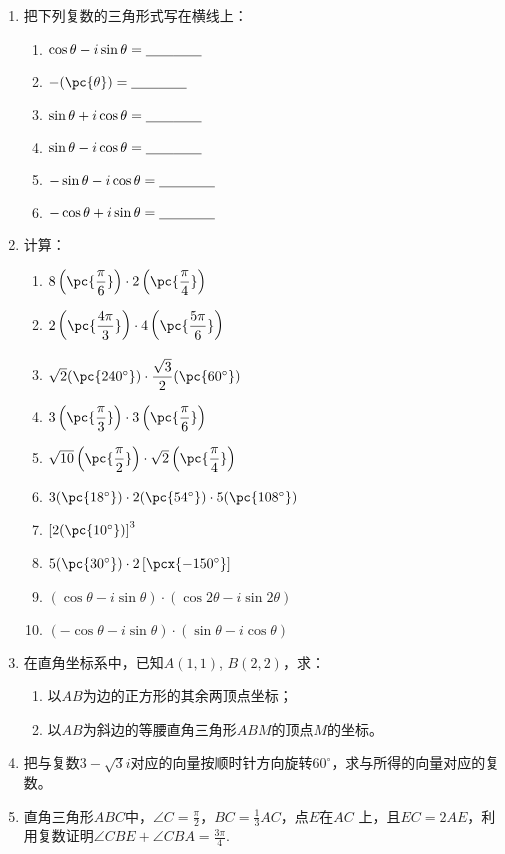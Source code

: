 \begin{enumerate}
    \item 把下列复数的三角形式写在横线上：
\begin{enumerate}[(1)]
    \item $\cos\theta-i\sin\theta = \underline{\qquad}\underline{\qquad}$
    \item $-(\pc{\theta}) = \blank\blank$
    \item $\sin\theta+i\cos\theta = \underline{\qquad}\underline{\qquad}$
    \item $\sin\theta-i\cos\theta = \underline{\qquad}\underline{\qquad}$
    \item $-\sin\theta-i\cos\theta = \underline{\qquad}\underline{\qquad}$
    \item $-\cos\theta+i\sin\theta = \underline{\qquad}\underline{\qquad}$
\end{enumerate}
    \item 计算：
\begin{enumerate}[(1)]
    \item $8\left(\pc{\frac{\pi}{6}}\right)\cdot 2\left(\pc{\frac{\pi}{4}}\right)$
    \item $2\left(\pc{\frac{4\pi}{3}}\right)\cdot 4\left(\pc{\frac{5\pi}{6}}\right)$
    \item $\sqrt{2}(\pc{240^{\circ}})\cdot \frac{\sqrt{3}}{2}(\pc{60^{\circ}})$
    \item $3\left(\pc{\frac{\pi}{3}}\right)\cdot 3\left(\pc{\frac{\pi}{6}}\right)$
    \item $\sqrt{10}\left(\pc{\frac{\pi}{2}}\right)\cdot \sqrt{2}\left(\pc{\frac{\pi}{4}}\right)$
    \item $3(\pc{18^{\circ}})\cdot 2(\pc{54^{\circ}})\cdot 5(\pc{108^{\circ}})$
    \item $\left[2(\pc{10^{\circ}})\right]^3$
    \item $5(\pc{30^{\circ}})\cdot 2\left[\pcx{-150^{\circ}}\right]$
    \item $(\cos\theta-i\sin\theta)\cdot (\cos2\theta-i\sin2\theta)$
    \item $(-\cos\theta-i\sin\theta)\cdot (\sin\theta-i\cos\theta)$
\end{enumerate}
    \item 在直角坐标系中，已知$A(1,1)$, $B(2,2)$，求：
\begin{enumerate}[(1)]
\item 以$AB$为边的正方形的其余两顶点坐标；
\item 以$AB$为斜边的等腰直角三角形$ABM$的顶点$M$的坐标。 
\end{enumerate}
\item 
把与复数$3-\sqrt{3}i$对应的向量按顺时针方向旋转$60^{\circ}$，求与所得的向量对应的复数。
\item 直角三角形$ABC$中，$\angle C=\frac{\pi}{2}$，$BC=\frac{1}{3}AC$，点$E$在$AC$
上，且$EC=2AE$，利用复数证明$\angle CBE+\angle CBA=\frac{3\pi}{4}$.


\end{enumerate}
